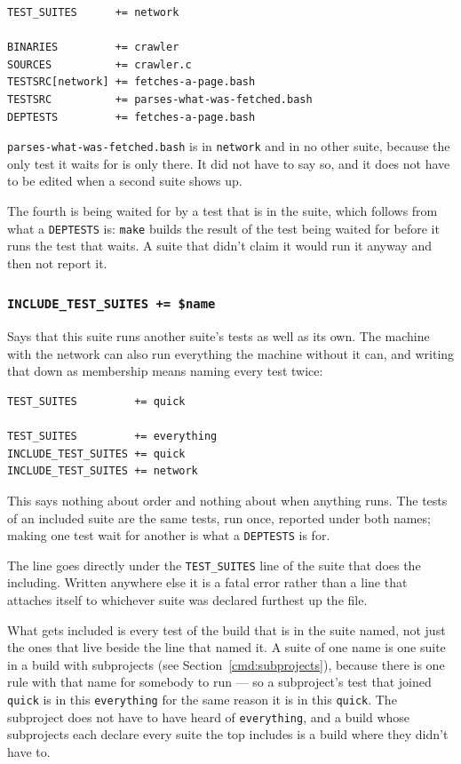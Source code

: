 \documentclass{article}
\begin{document}
\begin{verbatim}
TEST_SUITES      += network

BINARIES         += crawler
SOURCES          += crawler.c
TESTSRC[network] += fetches-a-page.bash
TESTSRC          += parses-what-was-fetched.bash
DEPTESTS         += fetches-a-page.bash
\end{verbatim}

\texttt{parses-what-was-fetched.bash} is in \texttt{network} and in
no other suite, because the only test it waits for is only there.  It
did not have to say so, and it does not have to be edited when a
second suite shows up.

The fourth is being waited for by a test that is in the suite, which
follows from what a \texttt{DEPTESTS} is: \texttt{make} builds the
result of the test being waited for before it runs the test that
waits.  A suite that didn't claim it would run it anyway and then not
report it.

\subsubsection{\texttt{INCLUDE\_TEST\_SUITES += \$name}
              \label{cmd:include_test_suites}}

Says that this suite runs another suite's tests as well as its own.
The machine with the network can also run everything the machine
without it can, and writing that down as membership means naming every
test twice:

\begin{verbatim}
TEST_SUITES         += quick

TEST_SUITES         += everything
INCLUDE_TEST_SUITES += quick
INCLUDE_TEST_SUITES += network
\end{verbatim}

This says nothing about order and nothing about when anything runs.
The tests of an included suite are the same tests, run once, reported
under both names; making one test wait for another is what a
\texttt{DEPTESTS} is for.

The line goes directly under the \texttt{TEST\_SUITES} line of the
suite that does the including.  Written anywhere else it is a fatal
error rather than a line that attaches itself to whichever suite was
declared furthest up the file.

What gets included is every test of the build that is in the suite
named, not just the ones that live beside the line that named it.  A
suite of one name is one suite in a build with subprojects (see
Section~\ref{cmd:subprojects}), because there is one rule with that
name for somebody to run --- so a subproject's test that joined
\texttt{quick} is in this \texttt{everything} for the same reason it
is in this \texttt{quick}.  The subproject does not have to have heard
of \texttt{everything}, and a build whose subprojects each declare
every suite the top includes is a build where they didn't have to.
\end{document}
